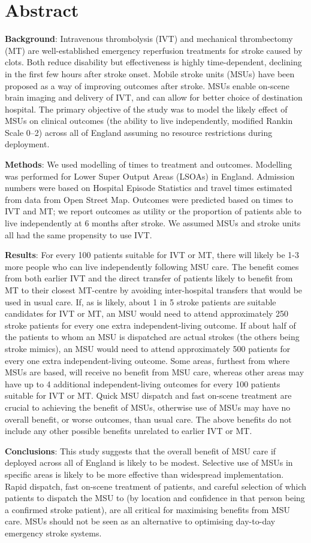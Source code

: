 \section*{Abstract}

\textbf{Background}: Intravenous thrombolysis (IVT) and mechanical thrombectomy (MT) are well-established emergency reperfusion treatments for stroke caused by clots. Both reduce disability but effectiveness is highly time-dependent, declining in the first few hours after stroke onset. Mobile stroke units (MSUs) have been proposed as a way of improving outcomes after stroke. MSUs enable on-scene brain imaging and delivery of IVT, and can allow for better choice of destination hospital. The primary objective of the study was to model the likely effect of MSUs on clinical outcomes (the ability to live independently, modified Rankin Scale 0--2) across all of England assuming no resource restrictions during deployment. 

\textbf{Methods}: We used modelling of times to treatment and outcomes. Modelling was performed for Lower Super Output Areas (LSOAs) in England. Admission numbers were based on Hospital Episode Statistics and travel times estimated from data from Open Street Map. Outcomes were predicted based on times to IVT and MT; we report outcomes as utility or the proportion of patients able to live independently at 6 months after stroke. We assumed MSUs and stroke units all had the same propensity to use IVT.

\textbf{Results}: For every 100 patients suitable for IVT or MT, there will likely be 1-3 more people who can live independently following MSU care. The benefit comes from both earlier IVT and the direct transfer of patients likely to benefit from MT to their closest MT-centre by avoiding inter-hospital transfers that would be used in usual care. If, as is likely, about 1 in 5 stroke patients are suitable candidates for IVT or MT, an MSU would need to attend approximately 250 stroke patients for every one extra independent-living outcome. If about half of the patients to whom an MSU is dispatched are actual strokes (the others being stroke mimics), an MSU would need to attend approximately 500 patients for every one extra independent-living outcome. Some areas, furthest from where MSUs are based, will receive no benefit from MSU care, whereas other areas may have up to 4 additional independent-living outcomes for every 100 patients suitable for IVT or MT. Quick MSU dispatch and fast on-scene treatment are crucial to achieving the benefit of MSUs, otherwise use of MSUs may have no overall benefit, or worse outcomes, than usual care. The above benefits do not include any other possible benefits unrelated to earlier IVT or MT.

\textbf{Conclusions}: This study suggests that the overall benefit of MSU care if deployed across all of England is likely to be modest. Selective use of MSUs in specific areas is likely to be more effective than widespread implementation. Rapid dispatch, fast on-scene treatment of patients, and careful selection of which patients to dispatch the MSU to (by location and confidence in that person being a confirmed stroke patient), are all critical for maximising benefits from MSU care. MSUs should not be seen as an alternative to optimising day-to-day emergency stroke systems.